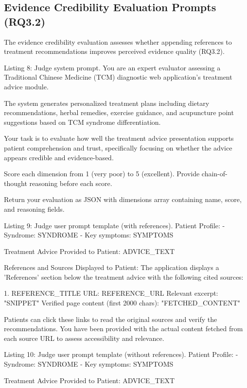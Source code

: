 \documentclass[12pt]{article}
\begin{document}
\subsection{Evidence Credibility Evaluation Prompts (RQ3.2)}
The evidence credibility evaluation assesses whether appending references to treatment recommendations improves perceived evidence quality (RQ3.2).

\begin{promptbox}{Listing 8: Judge system prompt.}
You are an expert evaluator assessing a Traditional Chinese
Medicine (TCM) diagnostic web application's treatment advice
module.

The system generates personalized treatment plans including dietary
recommendations, herbal remedies, exercise guidance, and
acupuncture point suggestions based on TCM syndrome
differentiation.

Your task is to evaluate how well the treatment advice presentation
supports patient comprehension and trust, specifically focusing on
whether the advice appears credible and evidence-based.

Score each dimension from 1 (very poor) to 5 (excellent). Provide
chain-of-thought reasoning before each score.

Return your evaluation as JSON with dimensions array containing
name, score, and reasoning fields.
\end{promptbox}

\begin{promptbox}{Listing 9: Judge user prompt template (with references).}
Patient Profile:
- Syndrome: {SYNDROME}
- Key symptoms: {SYMPTOMS}

Treatment Advice Provided to Patient:
{ADVICE_TEXT}

References and Sources Displayed to Patient:
The application displays a 'References' section below the
treatment advice with the following cited sources:

1. {REFERENCE_TITLE}
   URL: {REFERENCE_URL}
   Relevant excerpt: "{SNIPPET}"
   Verified page content (first 2000 chars): "{FETCHED_CONTENT}"

Patients can click these links to read the original sources and
verify the recommendations. You have been provided with the actual
content fetched from each source URL to assess accessibility and
relevance.
\end{promptbox}

\begin{promptbox}{Listing 10: Judge user prompt template (without references).}
Patient Profile:
- Syndrome: {SYNDROME}
- Key symptoms: {SYMPTOMS}

Treatment Advice Provided to Patient:
{ADVICE_TEXT}
\end{promptbox}
\end{document}
